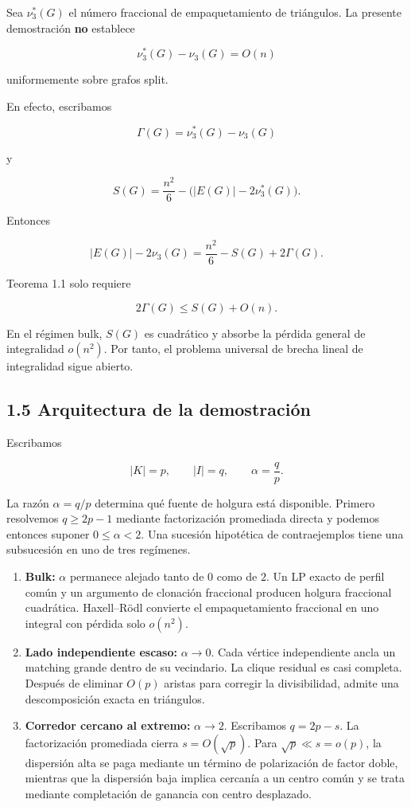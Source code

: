 \documentclass[
  11pt,
]{article}
\begin{document}
Sea \(\nu_3^*(G)\) el número fraccional de empaquetamiento de
triángulos. La presente demostración \textbf{no} establece

\[
\nu_3^*(G)-\nu_3(G)=O(n)
\tag{1.4}
\]

uniformemente sobre grafos split.

En efecto, escribamos

\[
\Gamma(G)=\nu_3^*(G)-\nu_3(G)
\]

y

\[
S(G)=\frac{n^2}{6}-\bigl(|E(G)|-2\nu_3^*(G)\bigr).
\]

Entonces

\[
|E(G)|-2\nu_3(G)
=
\frac{n^2}{6}-S(G)+2\Gamma(G).
\tag{1.5}
\]

Teorema 1.1 solo requiere

\[
2\Gamma(G)\le S(G)+O(n).
\]

En el régimen bulk, \(S(G)\) es cuadrático y absorbe la pérdida general
de integralidad \(o(n^2)\). Por tanto, el problema universal de brecha
lineal de integralidad sigue abierto.

\subsection{1.5 Arquitectura de la
demostración}\label{arquitectura-de-la-demostraciuxf3n}

Escribamos

\[
|K|=p,
\qquad
|I|=q,
\qquad
\alpha=\frac qp.
\]

La razón \(\alpha=q/p\) determina qué fuente de holgura está disponible.
Primero resolvemos \(q\ge2p-1\) mediante factorización promediada
directa y podemos entonces suponer \(0\le\alpha<2\). Una sucesión
hipotética de contraejemplos tiene una subsucesión en uno de tres
regímenes.

\begin{enumerate}
\def\labelenumi{\arabic{enumi}.}
\item
  \textbf{Bulk:} \(\alpha\) permanece alejado tanto de \(0\) como de
  \(2\). Un LP exacto de perfil común y un argumento de clonación
  fraccional producen holgura fraccional cuadrática. Haxell--Rödl
  convierte el empaquetamiento fraccional en uno integral con pérdida
  solo \(o(n^2)\).
\item
  \textbf{Lado independiente escaso:} \(\alpha\to0\). Cada vértice
  independiente ancla un matching grande dentro de su vecindario. La
  clique residual es casi completa. Después de eliminar \(O(p)\) aristas
  para corregir la divisibilidad, admite una descomposición exacta en
  triángulos.
\item
  \textbf{Corredor cercano al extremo:} \(\alpha\to2\). Escribamos
  \(q=2p-s\). La factorización promediada cierra \(s=O(\sqrt p)\). Para
  \(\sqrt p\ll s=o(p)\), la dispersión alta se paga mediante un término
  de polarización de factor doble, mientras que la dispersión baja
  implica cercanía a un centro común y se trata mediante completación de
  ganancia con centro desplazado.
\end{enumerate}
\end{document}
